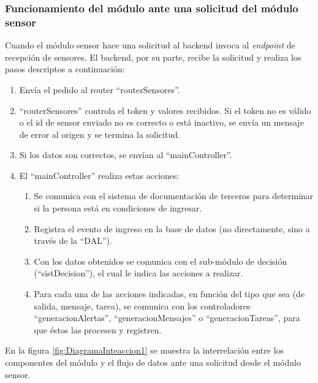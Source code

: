 \subsubsection{Funcionamiento del módulo ante una solicitud del módulo sensor}{\label{sec:subSeccionSolitiudModuloSensor}}   

Cuando el módulo sensor hace una solicitud al backend invoca al \textit{endpoint} de recepción de sensores. El backend, por su parte, recibe la solicitud y realiza los pasos descriptos a continuación: 

\begin{enumerate}
\item Envía el pedido al router ``routerSensores''. 
\item ``routerSensores'' controla el token y valores recibidos. Si el token no es válido o el id de sensor enviado no es correcto o está inactivo, se envía un mensaje de error al origen y se termina la solicitud.
\item Si los datos son correctos, se envían al ``mainController''.
\item El ``mainController'' realiza estas acciones:
	\begin{enumerate}
	\item Se comunica con el sistema de documentación de terceros para determinar si la persona está en condiciones de ingresar. 
	\item Registra el evento de ingreso en la base de datos (no directamente, sino a través de la ``DAL'').
	\item Con los datos obtenidos se comunica con el sub-módulo de decisión (``sistDecision''), el cual le indica las acciones a realizar. 
	\item Para cada una de las acciones indicadas, en función del tipo que sea (de salida, mensaje, tarea), se comunica con los controladores ``generacionAlertas'', ``generacionMensajes'' o ``generacionTareas'', para que éstos las procesen y registren.
	\end{enumerate}
\end{enumerate}

En la figura \ref{fig:DiagramaInteaccion1} se muestra la interrelación entre los componentes del módulo y el flujo de datos ante una solicitud desde el módulo sensor.

